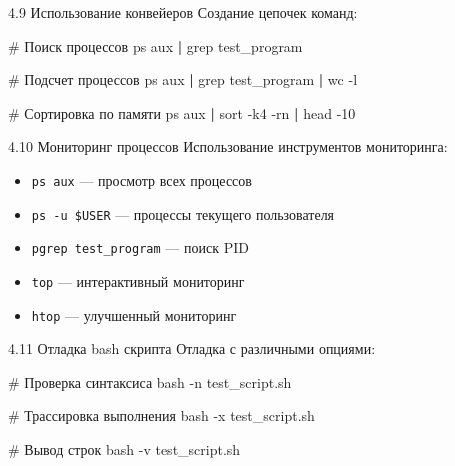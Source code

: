 \documentclass[
  ignorenonframetext,
  aspectratio=169,
  russian,
]{beamer}
\newenvironment{Shaded}{\begin{snugshade}}{\end{snugshade}}
\newcommand{\AttributeTok}[1]{\textcolor[rgb]{0.40,0.45,0.13}{#1}}
\newcommand{\CommentTok}[1]{\textcolor[rgb]{0.37,0.37,0.37}{#1}}
\newcommand{\FunctionTok}[1]{\textcolor[rgb]{0.28,0.35,0.67}{#1}}
\newcommand{\KeywordTok}[1]{\textcolor[rgb]{0.00,0.23,0.31}{\textbf{#1}}}
\newcommand{\NormalTok}[1]{\textcolor[rgb]{0.00,0.23,0.31}{#1}}
\providecommand{\tightlist}{%
  \setlength{\itemsep}{0pt}\setlength{\parskip}{0pt}}
\begin{document}
\begin{frame}[fragile]{4.9 Использование конвейеров}
\label{ux438ux441ux43fux43eux43bux44cux437ux43eux432ux430ux43dux438ux435-ux43aux43eux43dux432ux435ux439ux435ux440ux43eux432}
Создание цепочек команд:

\begin{Shaded}
\begin{Highlighting}[]
\CommentTok{\# Поиск процессов}
\FunctionTok{ps}\NormalTok{ aux }\KeywordTok{|} \FunctionTok{grep}\NormalTok{ test\_program}

\CommentTok{\# Подсчет процессов}
\FunctionTok{ps}\NormalTok{ aux }\KeywordTok{|} \FunctionTok{grep}\NormalTok{ test\_program }\KeywordTok{|} \FunctionTok{wc} \AttributeTok{{-}l}

\CommentTok{\# Сортировка по памяти}
\FunctionTok{ps}\NormalTok{ aux }\KeywordTok{|} \FunctionTok{sort} \AttributeTok{{-}k4} \AttributeTok{{-}rn} \KeywordTok{|} \FunctionTok{head} \AttributeTok{{-}10}
\end{Highlighting}
\end{Shaded}
\end{frame}

\begin{frame}[fragile]{4.10 Мониторинг процессов}
\label{ux43cux43eux43dux438ux442ux43eux440ux438ux43dux433-ux43fux440ux43eux446ux435ux441ux441ux43eux432}
Использование инструментов мониторинга:

\begin{itemize}[<+->]
\tightlist
\item
  \texttt{ps\ aux} --- просмотр всех процессов
\item
  \texttt{ps\ -u\ \$USER} --- процессы текущего пользователя
\item
  \texttt{pgrep\ test\_program} --- поиск PID
\item
  \texttt{top} --- интерактивный мониторинг
\item
  \texttt{htop} --- улучшенный мониторинг
\end{itemize}
\end{frame}

\begin{frame}[fragile]{4.11 Отладка bash скрипта}
\label{ux43eux442ux43bux430ux434ux43aux430-bash-ux441ux43aux440ux438ux43fux442ux430}
Отладка с различными опциями:

\begin{Shaded}
\begin{Highlighting}[]
\CommentTok{\# Проверка синтаксиса}
\FunctionTok{bash} \AttributeTok{{-}n}\NormalTok{ test\_script.sh}

\CommentTok{\# Трассировка выполнения}
\FunctionTok{bash} \AttributeTok{{-}x}\NormalTok{ test\_script.sh}

\CommentTok{\# Вывод строк}
\FunctionTok{bash} \AttributeTok{{-}v}\NormalTok{ test\_script.sh}
\end{Highlighting}
\end{Shaded}
\end{frame}
\end{document}
